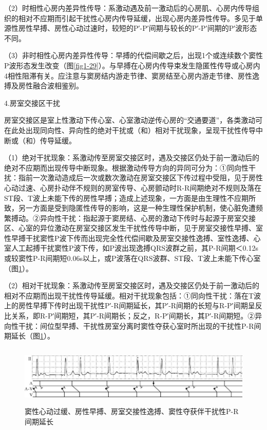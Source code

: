 （2）时相性心房内差异性传导：系激动遇及前一激动后的心房肌、心房内传导组织的相对不应期而引起干扰性心房内传导延缓，出现心房内差异性传导。多见于单源性房性早搏、房性心动过速时，较短的P′-P′间期与较长的P′-P′间期的P′波形态不同。

（3）非时相性心房内差异性传导：早搏的代偿间歇之后，出现1个或连续数个窦性P波形态发生改变（图\ref{fig1-29}）。与早搏在心房内传导束发生隐匿性传导或心房内4相性阻滞有关。应注意与窦房结内游走节律、窦房结至心房内游走节律、房性逸搏及房性融合波相鉴别。

4.房室交接区干扰

房室交接区是室上性激动下传心室、心室激动逆传心房的“交通要道”，各类激动可在此处出现同向性、异向性的绝对干扰或（和）相对干扰现象，呈现干扰性传导中断或（和）传导延缓。

（1）绝对干扰现象：系激动传至房室交接区时，遇及交接区仍处于前一激动后的绝对不应期而出现传导中断现象。根据激动传导方向的异同可分为：①同向性干扰：指前一次激动造成后一次或数次激动在房室交接区下传过程中受阻，见于房性心动过速、心房扑动伴不规则的房室传导、心房颤动时R-R间期绝对不规则及落在ST段、T波上未能下传的房性早搏；造成上述现象，一方面是由生理性不应期所致，另一方面是受到隐匿性传导的影响，这是一种生理性保护机制，使心脏免遭频繁搏动。②异向性干扰：指起源于窦房结、心房的激动下传时与起源于房室交接区、心室的异位激动在房室交接区发生干扰性传导中断，见于房室交接性早搏、室性早搏干扰窦性P波下传而出现完全性代偿间歇及房室交接性逸搏、室性逸搏、心室人工起搏干扰窦性P波下传，如P波出现逸搏QRS波群之前，其P-R间期＜0.12s或较窦性P-R间期短0.06s以上，或P波落在QRS波群、ST段、T波上未能下传心室（图\ref{fig26-3}）。

（2）相对干扰现象：系激动传至房室交接区时，遇及交接区仍处于前一激动后的相对不应期而出现干扰性传导延缓。相对干扰现象包括：①同向性干扰：落在T波上的房性早搏下传时出现干扰性P′-R间期延长，其P′-R间期的长短与R-P′间期呈反比关系，即R-P′间期短，其P′-R间期长；反之，R-P′间期长，其P′-R间期短。②异向性干扰：间位型早搏、干扰性房室分离时窦性夺获心室时所出现的干扰性P-R间期延长（图\ref{fig26-3}）。

\begin{figure}[!htbp]
 \centering
 \includegraphics[width=5.80208in,height=1.13542in]{./images/Image00444.jpg}
 \captionsetup{justification=centering}
 \caption{窦性心动过缓、房性早搏、房室交接性逸搏、窦性夺获伴干扰性P-R间期延长}
 \label{fig26-3}
  \end{figure} 


